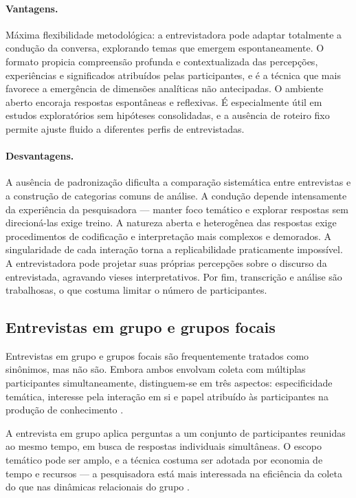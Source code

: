\documentclass[12pt, a4paper, openany]{book}
\begin{document}
\paragraph{Vantagens.} M\'axima flexibilidade metodol\'ogica: a entrevistadora pode adaptar totalmente a condu\c{c}\~ao da conversa, explorando temas que emergem espontaneamente. O formato propicia compreens\~ao profunda e contextualizada das percep\c{c}\~oes, experi\^encias e significados atribu\'idos pelas participantes, e \'e a t\'ecnica que mais favorece a emerg\^encia de dimens\~oes anal\'iticas n\~ao antecipadas. O ambiente aberto encoraja respostas espont\^aneas e reflexivas. \'E especialmente \'util em estudos explorat\'orios sem hip\'oteses consolidadas, e a aus\^encia de roteiro fixo permite ajuste fluido a diferentes perfis de entrevistadas.

\paragraph{Desvantagens.} A aus\^encia de padroniza\c{c}\~ao dificulta a compara\c{c}\~ao sistem\'atica entre entrevistas e a constru\c{c}\~ao de categorias comuns de an\'alise. A condu\c{c}\~ao depende intensamente da experi\^encia da pesquisadora --- manter foco tem\'atico e explorar respostas sem direcion\'a-las exige treino. A natureza aberta e heterog\^enea das respostas exige procedimentos de codifica\c{c}\~ao e interpreta\c{c}\~ao mais complexos e demorados. A singularidade de cada intera\c{c}\~ao torna a replicabilidade praticamente imposs\'ivel. A entrevistadora pode projetar suas pr\'oprias percep\c{c}\~oes sobre o discurso da entrevistada, agravando vieses interpretativos. Por fim, transcri\c{c}\~ao e an\'alise s\~ao trabalhosas, o que costuma limitar o n\'umero de participantes.

\subsection{Entrevistas em grupo e grupos focais}

Entrevistas em grupo e grupos focais s\~ao frequentemente tratados como sin\^onimos, mas n\~ao s\~ao. Embora ambos envolvam coleta com m\'ultiplas participantes simultaneamente, distinguem-se em tr\^es aspectos: especificidade tem\'atica, interesse pela intera\c{c}\~ao em si e papel atribu\'ido \`as participantes na produ\c{c}\~ao de conhecimento \citep{bryman2012social,neuman2014social}.

A entrevista em grupo aplica perguntas a um conjunto de participantes reunidas ao mesmo tempo, em busca de respostas individuais simult\^aneas. O escopo tem\'atico pode ser amplo, e a t\'ecnica costuma ser adotada por economia de tempo e recursos --- a pesquisadora est\'a mais interessada na efici\^encia da coleta do que nas din\^amicas relacionais do grupo \citep{bryman2012social}.
\end{document}

